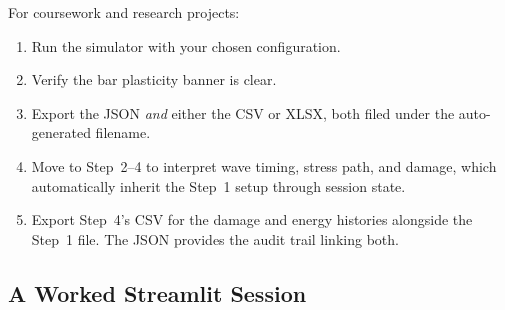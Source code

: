 \documentclass[11pt,a4paper]{article}
\begin{document}
\begin{conceptbox}
For coursework and research projects:
\begin{enumerate}[leftmargin=2em, itemsep=2pt]
  \item Run the simulator with your chosen configuration.
  \item Verify the bar plasticity banner is clear.
  \item Export the JSON \emph{and} either the CSV or XLSX, both filed under
        the auto-generated filename.
  \item Move to Step~2--4 to interpret wave timing, stress path, and damage,
        which automatically inherit the Step~1 setup through session state.
  \item Export Step~4's CSV for the damage and energy histories alongside the
        Step~1 file. The JSON provides the audit trail linking both.
\end{enumerate}
\end{conceptbox}

\subsection{A Worked Streamlit Session}
\end{document}
